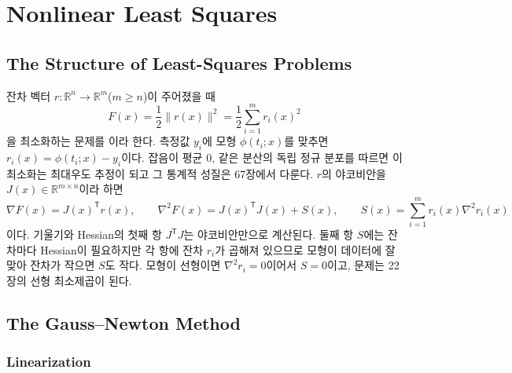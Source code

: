 \chapter{Nonlinear Least Squares}
\label{ch:nonlinear-least-squares}


\section{The Structure of Least-Squares Problems}
\label{sec:nls-structure}

잔차 벡터 $r:\mathbb R^n\to\mathbb R^m$($m\ge n$)이 주어졌을 때
\[
F(x)=\frac12\|r(x)\|^2=\frac12\sum_{i=1}^mr_i(x)^2
\]
을 최소화하는 문제를 이라 한다. 측정값 $y_i$에 모형 $\phi(t_i;x)$를 맞추면 $r_i(x)=\phi(t_i;x)-y_i$이다. 잡음이 평균 $0$, 같은 분산의 독립 정규 분포를 따르면 이 최소화는 최대우도 추정이 되고 그 통계적 성질은 67장에서 다룬다. $r$의 야코비안을 $J(x)\in\mathbb R^{m\times n}$이라 하면
\[
\nabla F(x)=J(x)^{\mathsf T}r(x),\qquad\nabla^2F(x)=J(x)^{\mathsf T}J(x)+S(x),\qquad S(x)=\sum_{i=1}^mr_i(x)\nabla^2r_i(x)
\]
이다. 기울기와 Hessian의 첫째 항 $J^{\mathsf T}J$는 야코비안만으로 계산된다. 둘째 항 $S$에는 잔차마다 Hessian이 필요하지만 각 항에 잔차 $r_i$가 곱해져 있으므로 모형이 데이터에 잘 맞아 잔차가 작으면 $S$도 작다. 모형이 선형이면 $\nabla^2r_i=0$이어서 $S=0$이고, 문제는 22장의 선형 최소제곱이 된다.

\section{The Gauss--Newton Method}
\label{sec:gauss-newton}

\subsection{Linearization}

